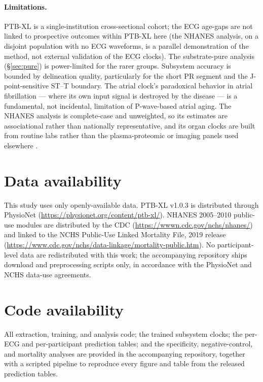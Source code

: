 \documentclass[11pt]{article}
\begin{document}
\paragraph{Limitations.}
PTB-XL is a single-institution cross-sectional cohort; the ECG age-gaps are not linked to
prospective outcomes within PTB-XL here (the NHANES analysis, on a disjoint population with no
ECG waveforms, is a parallel demonstration of the method, not external validation of the ECG
clocks). The substrate-pure analysis (\S\ref{sec:pure}) is power-limited for the rarer groups.
Subsystem accuracy is bounded by delineation quality, particularly for the short PR segment and
the J-point-sensitive ST--T boundary. The atrial clock's paradoxical behavior in atrial
fibrillation --- where its own input signal is destroyed by the disease --- is a fundamental,
not incidental, limitation of P-wave-based atrial aging. The NHANES analysis is complete-case
and unweighted, so its estimates are associational rather than nationally representative, and
its organ clocks are built from routine labs rather than the plasma-proteomic or imaging panels
used elsewhere \citep{tian2023organage, oh2023organage}.

\section*{Data availability}
This study uses only openly-available data. PTB-XL v1.0.3 is distributed through PhysioNet
\citep{wagner2020ptbxl, goldberger2000physionet}
(\url{https://physionet.org/content/ptb-xl/}). NHANES 2005--2010 public-use modules are
distributed by the CDC (\url{https://wwwn.cdc.gov/nchs/nhanes/}) and linked to the NCHS
Public-Use Linked Mortality File, 2019 release
(\url{https://www.cdc.gov/nchs/data-linkage/mortality-public.htm}). No participant-level data
are redistributed with this work; the accompanying repository ships download and preprocessing
scripts only, in accordance with the PhysioNet and NCHS data-use agreements.

\section*{Code availability}
All extraction, training, and analysis code; the trained subsystem clocks; the per-ECG and
per-participant prediction tables; and the specificity, negative-control, and mortality analyses
are provided in the accompanying repository, together with a scripted pipeline to reproduce
every figure and table from the released prediction tables.
\end{document}
